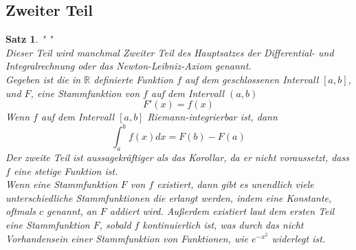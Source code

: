 \documentclass[fontsize=12pt,paper=a4,DIV12,cleardoublepage=empty, 
liststotoc,idxtotoc,bibtotoc]{article}
\newcommand{\RR}{\mathbb{R}}
\theoremstyle{plain}
\newtheorem{satz}{Satz}[subsection]
\theoremstyle{definition}
\begin{document}
	
	\subsection{Zweiter Teil}
	
	\begin{satz}" "\\
	Dieser Teil wird manchmal Zweiter Teil des Hauptsatzes der Differential- und Integralrechnung oder das Newton-Leibniz-Axiom genannt.\\
	Gegeben ist die in $\RR$ definierte Funktion $f$ auf dem geschlossenen Intervall $[a, b]$, und $F$, eine Stammfunktion von $f$ auf dem Intervall $(a, b)$
	\begin{equation*}
		F'(x)=f(x)
	\end{equation*}
	Wenn $f$ auf dem Intervall $[a, b]$ Riemann-integrierbar ist, dann 
	\begin{equation*}
		\int_{a}^{b}f(x)dx=F(b)-F(a)
	\end{equation*}
	Der zweite Teil ist aussagekräftiger als das Korollar, da er nicht voraussetzt, dass $f$ eine stetige Funktion ist.\\
	Wenn eine Stammfunktion $F$ von $f$ existiert, dann gibt es unendlich viele unterschiedliche Stammfunktionen die erlangt werden, indem eine Konstante, oftmals $c$ genannt, an $F$ addiert wird. Außerdem existiert laut dem ersten Teil eine Stammfunktion $F$, sobald $f$ kontinuierlich ist, was durch das nicht Vorhandensein einer Stammfunktion von Funktionen, wie $e^{-x^2}$ widerlegt ist.
	
	\end{satz}	
	
\end{document}
